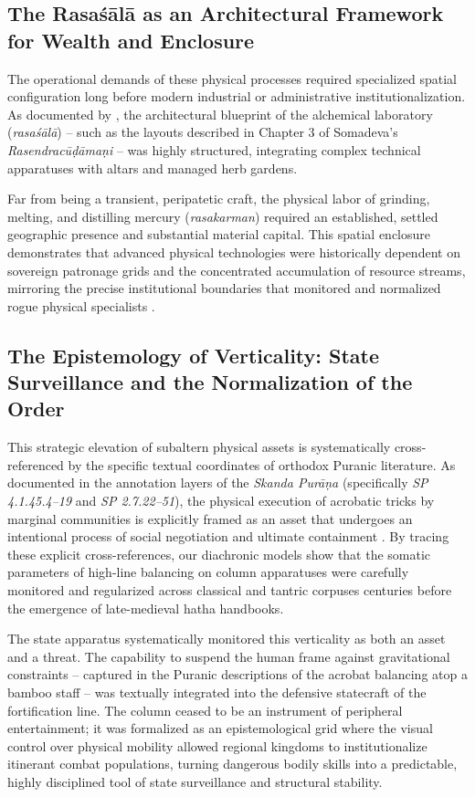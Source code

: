 \documentclass[11pt,twoside,letterpaper]{article}
\begin{document}
\subsection{The Rasaśālā as an Architectural Framework for Wealth and Enclosure}
The operational demands of these physical processes required specialized spatial configuration long before modern industrial or administrative institutionalization. As documented by \citet{Wujastyk2025}, the architectural blueprint of the alchemical laboratory (\textit{rasaśālā}) -- such as the layouts described in Chapter 3 of Somadeva’s \textit{Rasendracūḍāmaṇi} -- was highly structured, integrating complex technical apparatuses with altars and managed herb gardens.

Far from being a transient, peripatetic craft, the physical labor of grinding, melting, and distilling mercury (\textit{rasakarman}) required an established, settled geographic presence and substantial material capital. This spatial enclosure demonstrates that advanced physical technologies were historically dependent on sovereign patronage grids and the concentrated accumulation of resource streams, mirroring the precise institutional boundaries that monitored and normalized rogue physical specialists \citep{Wujastyk2025}.

\subsection{The Epistemology of Verticality: State Surveillance and the Normalization of the Order}
This strategic elevation of subaltern physical assets is systematically cross-referenced by the specific textual coordinates of orthodox Puranic literature. As documented in the annotation layers of the \textit{Skanda Purāṇa} (specifically \textit{SP 4.1.45.4–19} and \textit{SP 2.7.22–51}), the physical execution of acrobatic tricks by marginal communities is explicitly framed as an asset that undergoes an intentional process of social negotiation and ultimate containment \citep{Shastri1991}. By tracing these explicit cross-references, our diachronic models show that the somatic parameters of high-line balancing on column apparatuses were carefully monitored and regularized across classical and tantric corpuses centuries before the emergence of late-medieval hatha handbooks.

The state apparatus systematically monitored this verticality as both an asset and a threat. The capability to suspend the human frame against gravitational constraints – captured in the Puranic descriptions of the acrobat balancing atop a bamboo staff – was textually integrated into the defensive statecraft of the fortification line. The column ceased to be an instrument of peripheral entertainment; it was formalized as an epistemological grid where the visual control over physical mobility allowed regional kingdoms to institutionalize itinerant combat populations, turning dangerous bodily skills into a predictable, highly disciplined tool of state surveillance and structural stability.
\end{document}

